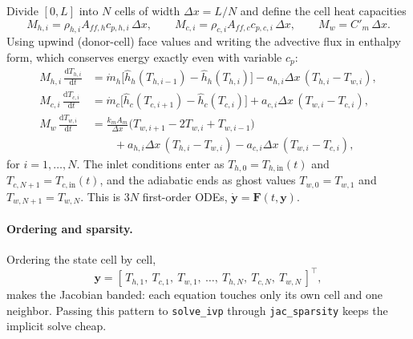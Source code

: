 \documentclass[11pt]{article}
\newcommand{\dd}{\mathrm{d}}
\newcommand{\hin}{_{h,\mathrm{in}}}
\newcommand{\cin}{_{c,\mathrm{in}}}
\begin{document}
Divide $[0,L]$ into $N$ cells of width $\Delta x = L/N$ and define the cell heat capacities
\begin{equation*}
  M_{h,i} = \rho_{h,i} A_{ff,h} c_{p,h,i}\,\Delta x, \qquad
  M_{c,i} = \rho_{c,i} A_{ff,c} c_{p,c,i}\,\Delta x, \qquad
  M_w = C'_m\,\Delta x .
\end{equation*}
Using upwind (donor-cell) face values and writing the advective flux in enthalpy form, which conserves energy exactly even with variable $c_p$:
\begin{align}
  M_{h,i}\,\frac{\dd T_{h,i}}{\dd t}
    &= \dot m_h\big[\hat h_h(T_{h,i-1}) - \hat h_h(T_{h,i})\big] - a_{h,i}\Delta x\,(T_{h,i} - T_{w,i}), \label{eq:mol_h}\\
  M_{c,i}\,\frac{\dd T_{c,i}}{\dd t}
    &= \dot m_c\big[\hat h_c(T_{c,i+1}) - \hat h_c(T_{c,i})\big] + a_{c,i}\Delta x\,(T_{w,i} - T_{c,i}), \label{eq:mol_c}\\
  M_w\,\frac{\dd T_{w,i}}{\dd t}
    &= \frac{k_m A_m}{\Delta x}\big(T_{w,i+1} - 2T_{w,i} + T_{w,i-1}\big) \nonumber\\
    &\qquad + a_{h,i}\Delta x\,(T_{h,i} - T_{w,i}) - a_{c,i}\Delta x\,(T_{w,i} - T_{c,i}), \label{eq:mol_w}
\end{align}
for $i = 1,\dots,N$. The inlet conditions enter as $T_{h,0} = T\hin(t)$ and $T_{c,N+1} = T\cin(t)$, and the adiabatic ends as ghost values $T_{w,0} = T_{w,1}$ and $T_{w,N+1} = T_{w,N}$. This is $3N$ first-order ODEs, $\dot{\bm y} = \bm F(t, \bm y)$.

\paragraph{Ordering and sparsity.} Ordering the state cell by cell,
\begin{equation*}
  \bm y = [\,T_{h,1},\ T_{c,1},\ T_{w,1},\ \dots,\ T_{h,N},\ T_{c,N},\ T_{w,N}\,]^\top,
\end{equation*}
makes the Jacobian banded: each equation touches only its own cell and one neighbor. Passing this pattern to \texttt{solve\_ivp} through \texttt{jac\_sparsity} keeps the implicit solve cheap.
\end{document}
